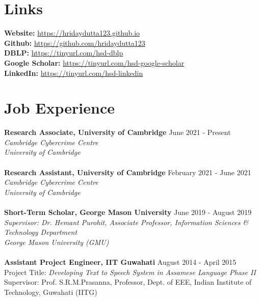 \documentclass[margin, centered]{res}
\begin{document}
\begin{resume}
\section{Links}
\textbf{Website:} \url{https://hridaydutta123.github.io} \\
\textbf{Github:} \url{https://github.com/hridaydutta123} \\
\textbf{DBLP:} \url{https://tinyurl.com/hsd-dblp} \\
\textbf{Google Scholar:} \url{https://tinyurl.com/hsd-google-scholar} \\
\textbf{LinkedIn:} \url{https://tinyurl.com/hsd-linkedin} \\

\section{Job Experience}
\textbf{Research Associate, University of Cambridge} \hfill June 2021 - Present\\
\emph{Cambridge Cybercrime Centre \\
University of Cambridge
} \\
\\
\textbf{Research Assistant, University of Cambridge} \hfill February 2021 - June 2021\\
\emph{Cambridge Cybercrime Centre \\
University of Cambridge
} \\
\\
\textbf{Short-Term Scholar, George Mason University} \hfill June 2019 - August 2019\\
\emph{Supervisor: Dr. Hemant Purohit,  Associate Professor, Information Sciences \& Technology Department \\ George Mason University (GMU)}  \\
\\
\textbf{Assistant Project Engineer, IIT Guwahati} \hfill August 2014 - April 2015 \\
Project Title: \textit{Developing Text to Speech System in Assamese Language Phase II} \\
Supervisor: Prof. S.R.M.Prasanna, Professor, Dept. of EEE, Indian Institute of Technology, Guwahati (IITG)




\end{resume}
\end{document}

